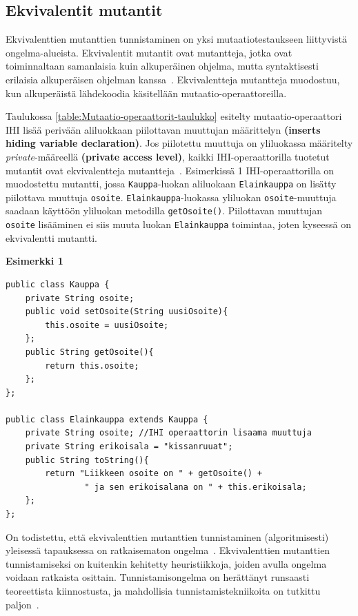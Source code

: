 \documentclass[finnish, grading]{tktltiki2}
\theoremstyle{definition}
\theoremstyle{remark}
\begin{document}
\subsection{Ekvivalentit mutantit}

Ekvivalenttien mutanttien tunnistaminen on yksi mutaatiotestaukseen liittyvistä ongelma-alueista. Ekvivalentit mutantit ovat mutantteja, jotka ovat toiminnaltaan samanlaisia kuin alkuperäinen ohjelma, mutta syntaktisesti erilaisia alkuperäisen ohjelman kanssa~\cite[s. 652]{Jia:Harman:2011}. Ekvivalentteja mutantteja muodostuu, kun alkuperäistä lähdekoodia käsitellään mutaatio-operaattoreilla. 

Taulukossa \ref{table:Mutaatio-operaattorit-taulukko} esitelty mutaatio-operaattori IHI lisää perivään aliluokkaan piilottavan muuttujan määrittelyn \textbf{(inserts hiding variable declaration)}. Jos piilotettu muuttuja on yliluokassa määritelty \textit{private}-määreellä \textbf{(private access level)}, kaikki IHI-operaattorilla tuotetut mutantit ovat ekvivalentteja mutantteja~\cite[s. 80]{Offutt:Ma:Kwon:2006:MuClassLevel}. Esimerkissä 1 IHI-operaattorilla on muodostettu mutantti, jossa \texttt{Kauppa}-luokan aliluokaan \texttt{Elainkauppa} on lisätty piilottava muuttuja \texttt{osoite}. \texttt{Elainkauppa}-luokassa yliluokan \texttt{osoite}-muuttuja saadaan käyttöön yliluokan metodilla \texttt{getOsoite()}. Piilottavan muuttujan \texttt{osoite} lisääminen ei siis muuta luokan \texttt{Elainkauppa} toimintaa, joten kyseessä on ekvivalentti mutantti. 

\vspace{1\baselineskip}\noindent\textbf{Esimerkki 1}
\begin{lstlisting} 
public class Kauppa {
	private String osoite;
	public void setOsoite(String uusiOsoite){
		this.osoite = uusiOsoite;
	};
	public String getOsoite(){
		return this.osoite;
	};
};

public class Elainkauppa extends Kauppa {
	private String osoite; //IHI operaattorin lisaama muuttuja
	private String erikoisala = "kissanruuat";
	public String toString(){
		return "Liikkeen osoite on " + getOsoite() +
		        " ja sen erikoisalana on " + this.erikoisala;
	};
};
\end{lstlisting}

\vspace{1\baselineskip}On todistettu, että ekvivalenttien mutanttien tunnistaminen (algoritmisesti) yleisessä tapauksessa on ratkaisematon ongelma~\cite[s. 79]{Offutt:Ma:Kwon:2006:MuClassLevel}. Ekvivalenttien mutanttien tunnistamiseksi on kuitenkin kehitetty heuristiikkoja, joiden avulla ongelma voidaan ratkaista osittain. Tunnistamisongelma on herättänyt runsaasti teoreettista kiinnostusta, ja mahdollisia tunnistamistekniikoita on tutkittu paljon~\cite[s. 657]{Jia:Harman:2011}. 
\end{document}
